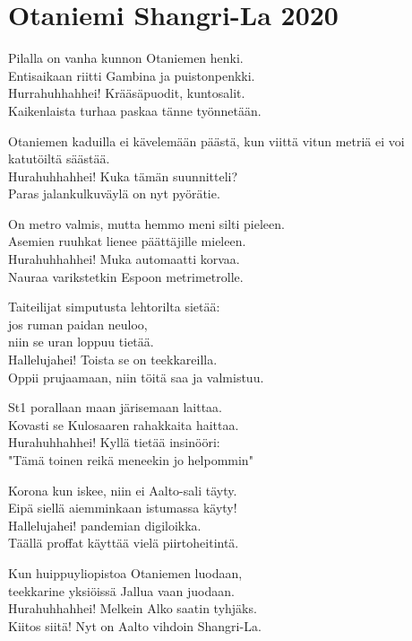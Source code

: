\section{Otaniemi Shangri-La 2020}
Pilalla on vanha kunnon Otaniemen henki.\\
Entisaikaan riitti Gambina ja puistonpenkki.\\
Hurrahuhhahhei! Krääsäpuodit, kuntosalit.\\
Kaikenlaista turhaa paskaa tänne työnnetään.

Otaniemen kaduilla ei kävelemään päästä,
kun viittä vitun metriä ei voi katutöiltä säästää.\\
Hurahuhhahhei! Kuka tämän suunnitteli?\\
Paras jalankulkuväylä on nyt pyörätie.

On metro valmis, mutta hemmo meni silti pieleen.\\
Asemien ruuhkat lienee päättäjille mieleen.\\
Hurahuhhahhei! Muka automaatti korvaa.\\
Nauraa varikstetkin Espoon metrimetrolle.

Taiteilijat simputusta lehtorilta sietää:\\
jos ruman paidan neuloo,\\
niin se uran loppuu tietää.\\
Hallelujahei! Toista se on teekkareilla.\\
Oppii prujaamaan, niin töitä saa ja valmistuu.

St1 porallaan maan järisemaan laittaa.\\
Kovasti se Kulosaaren rahakkaita haittaa.\\
Hurahuhhahhei! Kyllä tietää insinööri:\\
"Tämä toinen reikä meneekin jo helpommin"

Korona kun iskee, niin ei Aalto-sali täyty.\\
Eipä siellä aiemminkaan istumassa käyty!\\
Hallelujahei! pandemian digiloikka.\\
Täällä proffat käyttää vielä piirtoheitintä.

Kun huippuyliopistoa Otaniemen luodaan,\\
teekkarine yksiöissä Jallua vaan juodaan.\\
Hurahuhhahhei! Melkein Alko saatin tyhjäks.\\
Kiitos siitä! Nyt on Aalto vihdoin Shangri-La.